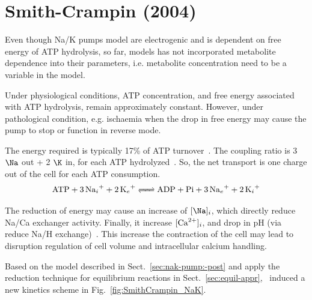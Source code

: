 \section{Smith-Crampin (2004)}
\label{sec:nak:-smith-crampin}

Even though Na/K pumps model are electrogenic and is dependent on free
energy of ATP hydrolysis, so far, models has not incorporated
metabolite dependence into their parameters, i.e. metabolite
concentration need to be a variable in the model.

Under physiological conditions, ATP concentration, and free energy
associated with ATP hydrolysis, remain approximately
constant. However, under pathological condition, e.g. ischaemia when
the drop in free energy may cause the pump to stop or function in
reverse mode.

The energy required is typically 17\% of ATP
turnover~\citep{schram1994}. The coupling ratio is 3$\Na$ out + 2 $\K$
in, for each ATP hydrolyzed~\citep{glitsch2001}. So, the net transport
is one charge out of the cell for each ATP consumption.
\begin{equation}
  \label{eq:1176}
  \ce{ATP + 3Na+_i + 2K+_e <=> ADP + Pi + 3Na+_e + 2K+_i}
\end{equation}

\begin{framed}
  The reduction of energy may cause an increase of $[\Na]_i$, which
  directly reduce Na/Ca exchanger activity. Finally, it increase
  $[{\text{Ca}^{2+}}]_i$, and drop in pH (via reduce Na/H
  exchange)~\citep{ingwall2002}. This increase the contraction of the
  cell may lead to disruption regulation of cell volume and
  intracellular calcium handling.
\end{framed}


Based on the model described in
Sect.~\ref{sec:nak-pump:-post} and apply the reduction technique for
equilibrium reactions in
Sect.~\ref{sec:equil-appr},~\citep{smith2004} induced a new
kinetics scheme in Fig.~\ref{fig:SmithCrampin_NaK}. 

